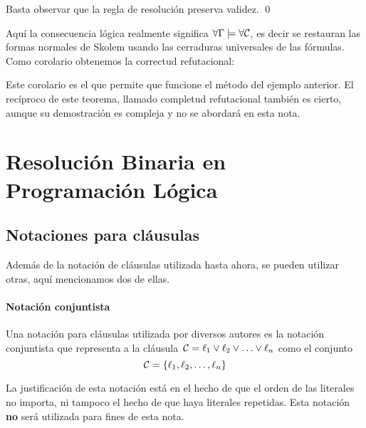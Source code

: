 \documentclass[11pt,letterpaper]{article}
\begin{document}
\proof 
Basta observar que la regla de resolución preserva validez.
\qed

\medskip

Aquí la consecuencia lógica realmente significa $\forall\Gamma\models\forall\mathcal{C}$, es decir
se restauran las formas normales de Skolem usando las cerraduras universales de 
las f\'ormulas. \\
Como corolario obtenemos la correctud refutacional:

Este corolario es el que permite que funcione el método del ejemplo anterior.
El recíproco de este teorema, llamado completud refutacional también es
cierto, aunque su demostración es compleja y no se abordar\'a en esta nota.



\section{Resolución Binaria en Programación Lógica}

\subsection{Notaciones para cláusulas}

Además de la notación de cláusulas utilizada hasta ahora, se pueden
utilizar otras, aquí mencionamos dos de ellas.

\paragraph{Notación conjuntista}
Una notaci\'on para cláusulas utilizada por diversos autores es la notaci\'on 
conjuntista que representa a la 
cl\'ausula~$\mathcal{C}= \ell_1\lor \ell_2\lor\ldots\lor \ell_n$
como el conjunto
$$
\mathcal{C}=\{\ell_1,\ell_2,\ldots,\ell_n\}
$$

La justificación de esta notaci\'on est\'a en el hecho de que el orden de
las literales no importa, ni tampoco el hecho de que haya literales
repetidas. Esta notaci\'on \textbf{no} ser\'a utilizada para fines de esta nota.
\end{document}
